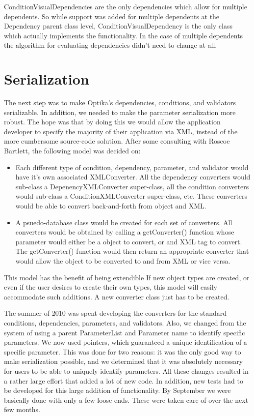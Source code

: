 ConditionVisualDependencies are the only dependencies which allow for multiple dependents. So while support was added for multiple dependents at the
Dependency parent class level, ConditionVisualDependency is the only class which actually implements the functionality. In the case of multiple dependents the algorithm
for evaluating dependencies didn't need to change at all.

\section{Serialization}
The next step was to make Optika's dependencies, conditions, and validators
 serializable. In addition, we needed to make the parameter serialization more 
robust. The hope was that by doing this we would allow the application 
developer to specify the majority of their application via XML, instead of the 
more cumbersome source-code solution. After some consulting with Roscoe 
Bartlett, the following model was decided on:
\begin{itemize}
	\item Each different type of condition, dependency, parameter, and validator
		 would have
		it's own associated XMLConverter. All the dependency converters would 
		sub-class a DepenencyXMLConverter super-class, all the condition converters
		would sub-class a ConditionXMLConverter super-class, etc. These converters
		would be able to convert back-and-forth from object and XML.
	\item A psuedo-database class would be created for each set of converters. All
	converters would be obtained by calling a getConverter() function whose 
	parameter would either be a object to convert, or
	and XML tag to convert. The getConverter() function would then return an
	appropriate converter that would allow the object to be converted to and from
	XML or vice versa.
\end{itemize}
This model has the benefit of being extendible If new object 
types are created, or even if the user desires to create their own types,
this model will easily accommodate such additions. A new converter class just
has to be created. 

The summer of 2010 was spent developing the converters for 
the standard conditions, dependencies, parameters, and validators. Also,
we changed from the system of using a parent ParameterList and Parameter name
to identify specific parameters. We now used pointers, which guaranteed a unique
identification of a specific parameter. This was done for two reasons: it was 
the only good way to make serialization possible, and we determined that it was
absolutely necessary for users to be able to uniquely identify parameters.
All these changes resulted in a rather large effort that added a lot of new
code. In addition, new tests had to be developed for this large addition of 
functionality. By September we were basically done with only a few loose ends.
These were taken care of over the next few months.


